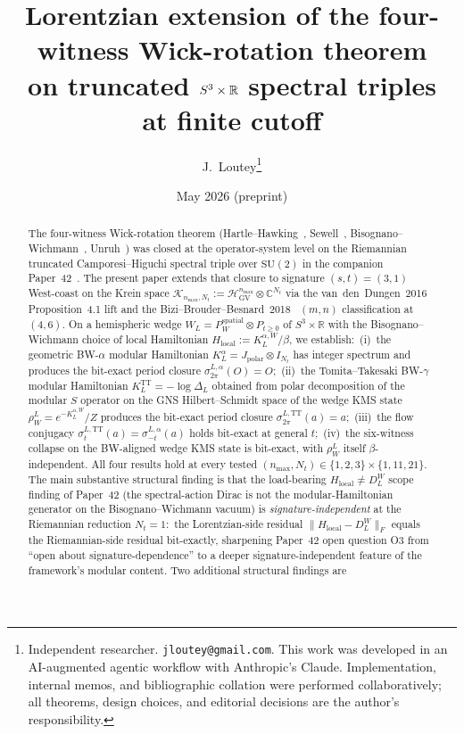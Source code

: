 \documentclass[11pt,a4paper]{article}
\title{Lorentzian extension of the four-witness Wick-rotation theorem\\
on truncated $\sthree \times \R$ spectral triples\\
at finite cutoff}
\author{J.~Loutey\thanks{Independent researcher. \texttt{jloutey@gmail.com}.
This work was developed in an AI-augmented agentic workflow with
Anthropic's Claude. Implementation, internal memos, and bibliographic
collation were performed collaboratively; all theorems, design choices,
and editorial decisions are the author's responsibility.}}
\date{May 2026 (preprint)}
\theoremstyle{plain}
\theoremstyle{definition}
\newcommand{\nmax}{n_{\max}}
\newcommand{\Nt}{N_t}
\newcommand{\sthree}{S^{3}}
\newcommand{\Hilb}{\mathcal{H}}
\newcommand{\Krein}{\mathcal{K}}
\newcommand{\Frob}[1]{\lVert #1 \rVert_{F}}
\newcommand{\R}{\mathbb{R}}
\newcommand{\C}{\mathbb{C}}
\newcommand{\SU}{\mathrm{SU}}
\newcommand{\DL}{D_{L}}
\newcommand{\KL}{K_{L}}
\newcommand{\TT}{\mathrm{TT}}
\begin{document}
\maketitle

\begin{abstract}
The four-witness Wick-rotation theorem
(Hartle--Hawking~\cite{hartle_hawking1976}, Sewell~\cite{sewell1982},
Bisognano--Wichmann~\cite{bisognano_wichmann1976},
Unruh~\cite{unruh1976}) was closed at the operator-system level on the
Riemannian truncated Camporesi--Higuchi spectral triple over $\SU(2)$
in the companion Paper~42~\cite{paper42}. The present paper extends
that closure to signature $(s, t) = (3, 1)$ West-coast on the Krein
space $\Krein_{\nmax, \Nt} := \Hilb_{\mathrm{GV}}^{\nmax} \otimes
\C^{\Nt}$ via the
van~den~Dungen~2016~\cite{vandungen2016} Proposition~4.1 lift and the
Bizi--Brouder--Besnard~2018~\cite{bizi_brouder_besnard2018}
$(m, n)$ classification at $(4, 6)$. On a hemispheric wedge
$W_L = P_W^{\mathrm{spatial}} \otimes P_{t \ge 0}$ of $\sthree \times
\R$ with the Bisognano--Wichmann choice of local Hamiltonian
$H_{\mathrm{local}} := \KL^{\alpha, W} / \beta$, we establish:\ (i)~the
geometric BW-$\alpha$ modular Hamiltonian $\KL^\alpha = J_{\mathrm{polar}}
\otimes I_{\Nt}$ has integer spectrum and produces the bit-exact period
closure $\sigma_{2\pi}^{L, \alpha}(O) = O$;\ (ii)~the Tomita--Takesaki
BW-$\gamma$ modular Hamiltonian $\KL^\TT = -\log \Delta_L$ obtained
from polar decomposition of the modular $S$ operator on the GNS
Hilbert--Schmidt space of the wedge KMS state $\rho_W^L = e^{-\KL^{\alpha,
W}}/Z$ produces the bit-exact period closure
$\sigma_{2\pi}^{L, \TT}(a) = a$;\ (iii)~the flow conjugacy
$\sigma_t^{L, \TT}(a) = \sigma_{-t}^{L, \alpha}(a)$ holds bit-exact at
general $t$;\ (iv)~the six-witness collapse on the BW-aligned wedge
KMS state is bit-exact, with $\rho_W^L$ itself $\beta$-independent.
All four results hold at every tested
$(\nmax, \Nt) \in \{1, 2, 3\} \times \{1, 11, 21\}$. The main
substantive structural finding is that the load-bearing
$H_{\mathrm{local}} \ne \DL^W$ scope finding of Paper~42 (the
spectral-action Dirac is not the modular-Hamiltonian generator on the
Bisognano--Wichmann vacuum) is \emph{signature-independent} at the
Riemannian reduction $\Nt = 1$:\ the Lorentzian-side residual
$\Frob{H_{\mathrm{local}} - \DL^W}$ equals the Riemannian-side residual
bit-exactly, sharpening Paper~42 open question O3 from ``open about
signature-dependence'' to a deeper signature-independent feature of the
framework's modular content. Two additional structural findings are

\end{abstract}
\end{document}
